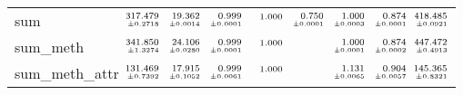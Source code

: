 \documentclass[a4paper,UKenglish]{lipics-v2016}
\begin{document}
\begin{table*}[t]
\begin{adjustbox}{width=1.2\textwidth,center}
\begin{tabular}{lrrrrrrrr}
sum&$\substack{\mathmakebox[.7cm][r]{317.479}\\{\mathmakebox[.7cm][r]{\scriptscriptstyle \pm 0.2718}}}$&$\substack{\mathmakebox[.7cm][r]{19.362}\\{\mathmakebox[.7cm][r]{\scriptscriptstyle \pm 0.0014}}}$&$\substack{\mathmakebox[.7cm][r]{0.999}\\{\mathmakebox[.7cm][r]{\scriptscriptstyle \pm 0.0001}}}$&$\substack{\mathmakebox[.7cm][r]{1.000}\\{\mathmakebox[.7cm][r]{\scriptscriptstyle }}}$&$\substack{\mathmakebox[.7cm][r]{0.750}\\{\mathmakebox[.7cm][r]{\scriptscriptstyle \pm 0.0001}}}$&$\substack{\mathmakebox[.7cm][r]{1.000}\\{\mathmakebox[.7cm][r]{\scriptscriptstyle \pm 0.0003}}}$&$\substack{\mathmakebox[.7cm][r]{0.874}\\{\mathmakebox[.7cm][r]{\scriptscriptstyle \pm 0.0001}}}$&$\substack{\mathmakebox[.7cm][r]{418.485}\\{\mathmakebox[.7cm][r]{\scriptscriptstyle \pm 0.0921}}}$\\
\addlinespace
sum\_meth&$\substack{\mathmakebox[.7cm][r]{341.850}\\{\mathmakebox[.7cm][r]{\scriptscriptstyle \pm 1.3274}}}$&$\substack{\mathmakebox[.7cm][r]{24.106}\\{\mathmakebox[.7cm][r]{\scriptscriptstyle \pm 0.0280}}}$&$\substack{\mathmakebox[.7cm][r]{0.999}\\{\mathmakebox[.7cm][r]{\scriptscriptstyle \pm 0.0001}}}$&$\substack{\mathmakebox[.7cm][r]{1.000}\\{\mathmakebox[.7cm][r]{\scriptscriptstyle }}}$&&$\substack{\mathmakebox[.7cm][r]{1.000}\\{\mathmakebox[.7cm][r]{\scriptscriptstyle \pm 0.0001}}}$&$\substack{\mathmakebox[.7cm][r]{0.874}\\{\mathmakebox[.7cm][r]{\scriptscriptstyle \pm 0.0002}}}$&$\substack{\mathmakebox[.7cm][r]{447.472}\\{\mathmakebox[.7cm][r]{\scriptscriptstyle \pm 0.4913}}}$\\
\addlinespace
sum\_meth\_attr&$\substack{\mathmakebox[.7cm][r]{131.469}\\{\mathmakebox[.7cm][r]{\scriptscriptstyle \pm 0.7392}}}$&$\substack{\mathmakebox[.7cm][r]{17.915}\\{\mathmakebox[.7cm][r]{\scriptscriptstyle \pm 0.1052}}}$&$\substack{\mathmakebox[.7cm][r]{0.999}\\{\mathmakebox[.7cm][r]{\scriptscriptstyle \pm 0.0061}}}$&$\substack{\mathmakebox[.7cm][r]{1.000}\\{\mathmakebox[.7cm][r]{\scriptscriptstyle }}}$&&$\substack{\mathmakebox[.7cm][r]{1.131}\\{\mathmakebox[.7cm][r]{\scriptscriptstyle \pm 0.0065}}}$&$\substack{\mathmakebox[.7cm][r]{0.904}\\{\mathmakebox[.7cm][r]{\scriptscriptstyle \pm 0.0057}}}$&$\substack{\mathmakebox[.7cm][r]{145.365}\\{\mathmakebox[.7cm][r]{\scriptscriptstyle \pm 0.8321}}}$\\

\end{tabular}
\end{adjustbox}
\end{table*}
\end{document}
